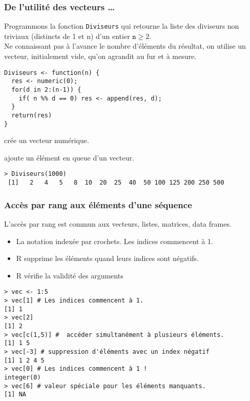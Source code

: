 \documentclass[10pt]{beamer}
\begin{document}
\begin{frame}[fragile]
  \frametitle{De l’utilité des vecteurs \dots}
  Programmons la fonction \texttt{Diviseurs} qui retourne la liste des diviseurs non triviaux (distincts de 1 et n) d'un entier $\mathtt{n} \geq 2$. \\
  Ne connaissant pas à l'avance le nombre d'éléments du résultat, on utilise un vecteur, initialement vide, qu'on agrandit au fur et à mesure.
  \begin{lstlisting}[style=editor]
Diviseurs <- function(n) {
  res <- numeric(0);
  for(d in 2:(n-1)) {
    if( n %% d == 0) res <- append(res, d);
  }
  return(res)
}    
\end{lstlisting}

\begin{description}
\item[\texttt{numeric}] crée un vecteur numérique. 
\item[\texttt{append}] ajoute un élément en queue d'un vecteur.
\end{description}
\begin{lstlisting}
> Diviseurs(1000)
 [1]   2   4   5   8  10  20  25  40  50 100 125 200 250 500  
\end{lstlisting}
\end{frame}

\begin{frame}[fragile]
  \frametitle{Accès par rang aux éléments d'une séquence}
  L'accès par rang est commun aux vecteurs, listes, matrices, data frames.\\
  \begin{itemize}
  \item \alert{La notation indexée par crochets. Les indices commencent à 1.}
  \item R supprime les éléments quand leurs indices sont négatifs.
  \item R vérifie la validité des arguments
  \end{itemize}

  
  \begin{lstlisting}
> vec <- 1:5
> vec[1] # Les indices commencent à 1.
[1] 1
> vec[2]
[1] 2
> vec[c(1,5)] #  accéder simultanément à plusieurs éléments.
[1] 1 5
> vec[-3] # suppression d'éléments avec un index négatif
[1] 1 2 4 5
> vec[0] # Les indices commencent à 1 !
integer(0)
> vec[6] # valeur spéciale pour les éléments manquants.
[1] NA   
\end{lstlisting}
\end{frame}
\end{document}
